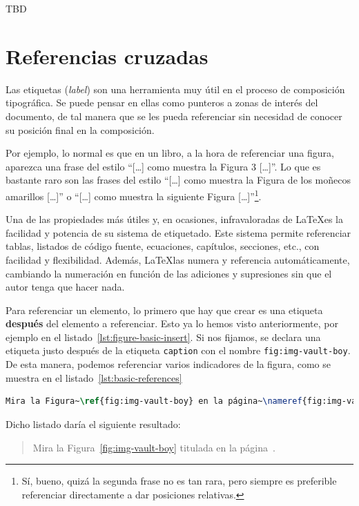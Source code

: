 \documentclass[%
    school=etsisi,%
    type=pfg,%
    degree=61CI,%
]{upm-report}
\begin{document}
TBD

\section{Referencias cruzadas}
\label{s:crossref}

Las etiquetas (\textit{label}) son una herramienta muy útil en el proceso de composición tipográfica. Se puede pensar en ellas como punteros a zonas de interés del documento, de tal manera que se les pueda referenciar sin necesidad de conocer su posición final en la composición.

Por ejemplo, lo normal es que en un libro, a la hora de referenciar una figura, aparezca una frase del estilo ``[\ldots] como muestra la Figura 3 [\ldots]''. Lo que es bastante raro son las frases del estilo ``[\ldots] como muestra la Figura de los moñecos amarillos [\ldots]'' o ``[\ldots] como muestra la siguiente Figura [\ldots]''\footnote{Sí, bueno, quizá la segunda frase no es tan rara, pero siempre es preferible referenciar directamente a dar posiciones relativas.}.

Una de las propiedades más útiles y, en ocasiones, infravaloradas de \LaTeX es la facilidad y potencia de su sistema de etiquetado. Este sistema permite referenciar tablas, listados de código fuente, ecuaciones, capítulos, secciones, etc., con facilidad y flexibilidad. Además, \LaTeX las numera y referencia automáticamente, cambiando la numeración en función de las adiciones y supresiones sin que el autor tenga que hacer nada.

Para referenciar un elemento, lo primero que hay que crear es una etiqueta \textbf{después} del elemento a referenciar. Esto ya lo hemos visto anteriormente, por ejemplo en el listado~\ref{lst:figure-basic-insert}. Si nos fijamos, se declara una etiqueta justo después de la etiqueta \texttt{caption} con el nombre \texttt{fig:img-vault-boy}. De esta manera, podemos referenciar varios indicadores de la figura, como se muestra en el listado~\ref{lst:basic-references}

\begin{lstlisting}[language=tex, caption=Referenciando una figura y su página,label={lst:basic-references},]
Mira la Figura~\ref{fig:img-vault-boy} en la página~\nameref{fig:img-vault-boy}.
\end{lstlisting}

Dicho listado daría el siguiente resultado:

\blockquote{Mira la Figura~\ref{fig:img-vault-boy} titulada  en la página~\pageref{fig:img-vault-boy}.}
\end{document}
